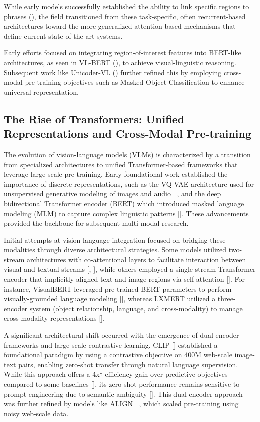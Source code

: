 \documentclass[11pt]{article}
\begin{document}
While early models successfully established the ability to link specific regions to phrases (\citep{1505.04870}), the field transitioned from these task-specific, often recurrent-based architectures toward the more generalized attention-based mechanisms that define current state-of-the-art systems.

Early efforts focused on integrating region-of-interest features into BERT-like architectures, as seen in VL-BERT (\citep{1908.08530}), to achieve visual-linguistic reasoning. Subsequent work like Unicoder-VL (\citep{1908.06066}) further refined this by employing cross-modal pre-training objectives such as Masked Object Classification to enhance universal representation.
\subsection{The Rise of Transformers: Unified Representations and Cross-Modal Pre-training}

The evolution of vision-language models (VLMs) is characterized by a transition from specialized architectures to unified Transformer-based frameworks that leverage large-scale pre-training. Early foundational work established the importance of discrete representations, such as the VQ-VAE architecture used for unsupervised generative modeling of images and audio [\citep{1711.00937}], and the deep bidirectional Transformer encoder (BERT) which introduced masked language modeling (MLM) to capture complex linguistic patterns [\citep{1810.04805}]. These advancements provided the backbone for subsequent multi-modal research.

Initial attempts at vision-language integration focused on bridging these modalities through diverse architectural strategies. Some models utilized two-stream architectures with co-attentional layers to facilitate interaction between visual and textual streams [\citep{1908.02265}, \citep{1912.02315}], while others employed a single-stream Transformer encoder that implicitly aligned text and image regions via self-attention [\citep{1908.03557}]. For instance, VisualBERT leveraged pre-trained BERT parameters to perform visually-grounded language modeling [\citep{1908.03557}], whereas LXMERT utilized a three-encoder system (object relationship, language, and cross-modality) to manage cross-modality representations [\citep{1908.07490}].

A significant architectural shift occurred with the emergence of dual-encoder frameworks and large-scale contrastive learning. CLIP [\citep{2103.00020}] established a foundational paradigm by using a contrastive objective on 400M web-scale image-text pairs, enabling zero-shot transfer through natural language supervision. While this approach offers a 4x† efficiency gain over predictive objectives compared to some baselines [\citep{2103.00020}], its zero-shot performance remains sensitive to prompt engineering due to semantic ambiguity [\citep{2103.00020}]. This dual-encoder approach was further refined by models like ALIGN [\citep{2102.05918}], which scaled pre-training using noisy web-scale data.
\end{document}
